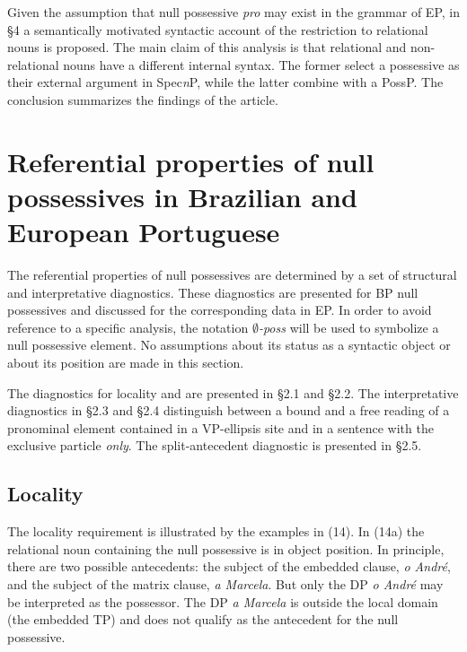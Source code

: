 \documentclass[output=paper]{langsci/langscibook}
\begin{document}
Given the assumption that null possessive \textit{pro} may exist in the grammar of EP, in §4 a semantically motivated syntactic account of the restriction to relational nouns is proposed. The main claim of this analysis is that relational and non-relational nouns have a different internal syntax. The former select a possessive as their external argument in Spec\textit{n}P, while the latter combine with a PossP. The conclusion summarizes the findings of the article.

\section{Referential properties of null possessives in Brazilian and European Portuguese}%

The referential properties of null possessives are determined by a set of structural and interpretative diagnostics. These diagnostics are presented for BP null possessives and discussed for the corresponding data in EP. In order to avoid reference to a specific analysis, the notation \textit{$\emptyset$-poss} will be used to symbolize a null possessive element. No assumptions about its status as a syntactic object or about its position are made in this section.  

The diagnostics for locality and  are presented in §2.1 and §2.2. The interpretative diagnostics in §2.3 and §2.4 distinguish between a bound and a free reading of a pronominal element contained in a VP-ellipsis site and in a sentence with the exclusive particle \textit{only}. The split-antecedent diagnostic is presented in §2.5.

\subsection{Locality}%

The locality requirement is illustrated by the examples in (14). In (14a) the relational noun containing the null possessive is in object position. In principle, there are two possible antecedents: the subject of the embedded clause, \textit{o André}, and the subject of the matrix clause, \textit{a Marcela}. But only the DP \textit{o André} may be interpreted as the possessor. The DP \textit{a Marcela} is outside the local domain (the embedded TP) and does not qualify as the antecedent for the null possessive. 
\end{document}

